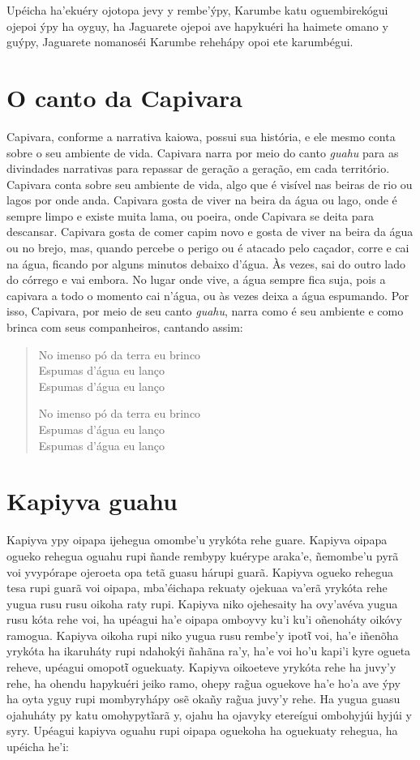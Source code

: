 Upéicha ha'ekuéry ojotopa jevy y rembe'ýpy, Karumbe katu oguembirekógui
ojepoi ýpy ha oyguy, ha Jaguarete ojepoi ave hapykuéri ha haimete omano
y guýpy, Jaguarete nomanoséi Karumbe rehehápy opoi ete karumbégui.

\chapter{O canto da Capivara}

Capivara, conforme a narrativa kaiowa, possui sua história, e ele mesmo
conta sobre o seu ambiente de vida. Capivara narra por meio do canto
\emph{guahu} para as divindades narrativas para repassar de geração a
geração, em cada território. Capivara conta sobre seu ambiente de vida,
algo que é visível nas beiras de rio ou lagos por onde anda. Capivara
gosta de viver na beira da água ou lago, onde é sempre limpo e existe
muita lama, ou poeira, onde Capivara se deita para descansar. Capivara
gosta de comer capim novo e gosta de viver na beira da água ou no brejo,
mas, quando percebe o perigo ou é atacado pelo caçador, corre e cai na
água, ficando por alguns minutos debaixo d'água. Às vezes, sai do outro
lado do córrego e vai embora. No lugar onde vive, a água sempre fica
suja, pois a capivara a todo o momento cai n'água, ou às vezes deixa a
água espumando. Por isso, Capivara, por meio de seu canto \emph{guahu},
narra como é seu ambiente e como brinca com seus companheiros, cantando
assim:

\begin{verse}
No imenso pó da terra eu brinco\\
Espumas d'água eu lanço\\
Espumas d'água eu lanço

No imenso pó da terra eu brinco\\
Espumas d'água eu lanço\\
Espumas d'água eu lanço
\end{verse}

\chapter{Kapiyva guahu}

Kapiyva ypy oipapa ijehegua omombe'u yrykóta rehe guare. Kapiyva oipapa
ogueko rehegua oguahu rupi ñande rembypy kuérype araka'e, ñemombe'u pyrã
voi yvypórape ojeroeta opa tetã guasu hárupi guarã. Kapiyva ogueko
rehegua tesa rupi guarã voi oipapa, mba'éichapa rekuaty ojekuaa va'erã
yrykóta rehe yugua rusu rusu oikoha raty rupi. Kapiyva niko ojehesaity
ha ovy'avéva yugua rusu kóta rehe voi, ha upéagui ha'e oipapa omboyvy
ku'i ku'i oñenoháty oikóvy ramogua. Kapiyva oikoha rupi niko yugua rusu
rembe'y ipotῖ voi, ha'e iñenõha yrykóta ha ikaruháty rupi ndahokýi
ñahãna ra'y, ha'e voi ho'u kapi'i kyre ogueta reheve, upéagui omopotῖ
oguekuaty. Kapiyva oikoeteve yrykóta rehe ha juvy'y rehe, ha ohendu
hapykuéri jeiko ramo, ohepy rag̃ua oguekove ha'e ho'a ave ýpy ha oyta
yguy rupi mombyryhápy osẽ okañy rag̃ua juvy'y rehe. Ha yugua guasu
ojahuháty py katu omohypytĩarã y, ojahu ha ojavyky etereígui ombohyjúi
hyjúi y syry. Upéagui kapiyva oguahu rupi oipapa oguekoha ha oguekuaty
rehegua, ha upéicha he'i:

